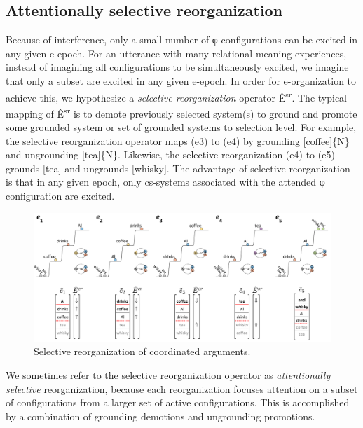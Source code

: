 \subsection{Attentionally selective reorganization}

Because of interference, only a small number of φ configurations can be excited in any given e-epoch. For an utterance with many relational meaning experiences, instead of imagining all configurations to be simultaneously excited, we imagine that only a subset are excited in any given e-epoch. In order for e-organization to achieve this, we hypothesize a \textit{selective reorganization} operator Ê\textsuperscript{sr}. The typical mapping of  Ê\textsuperscript{sr} is to demote previously selected system(s) to ground and promote some grounded system or set of grounded systems to selection level. For example, the selective reorganization operator maps (e3) to (e4) by grounding [coffee]\{N\} and ungrounding [tea]\{N\}. Likewise, the selective reorganization (e4) to (e5) grounds [tea] and ungrounds [whisky]. The advantage of selective reorganization is that in any given epoch, only cs-systems associated with the attended φ configuration are excited.

  
\begin{figure}
\includegraphics[width=\textwidth]{figures/Tilsen-img99.png}
\caption{Selective reorganization of coordinated arguments.}
\label{fig:4:49}
\end{figure}
   

  We sometimes refer to the selective reorganization operator as \textit{attentionally selective} reorganization, because each reorganization focuses attention on a subset of configurations from a larger set of active configurations. This is accomplished by a combination of grounding demotions and ungrounding promotions.

